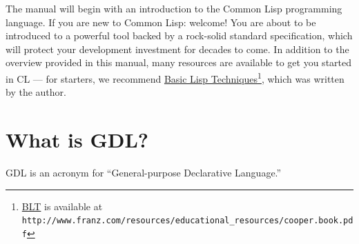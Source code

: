 \documentclass [11pt]{book}
\begin{document}
The manual will begin with an introduction to the Common Lisp programming language. If you are new to Common Lisp: welcome!
You are about to be introduced to a powerful tool backed by a
rock-solid standard specification, which will protect your development
investment for decades to come. In addition to the overview provided
in this manual, many resources are available to get you started in CL
--- for starters, we recommend 
\underline{Basic Lisp Techniques}\footnote{
\underline{BLT} is available at \texttt{http://www.franz.com/resources/educational\_resources/cooper.book.pdf}}, which was written by the author. 

\section{What is GDL?}

\label{sec:whatisgdl?}

GDL is an acronym for
``General-purpose Declarative Language.''
\end{document}
